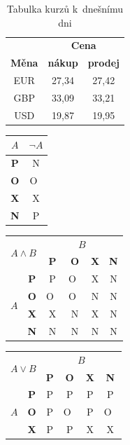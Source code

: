 \documentclass[11pt,a4paper]{article}
\begin{document}
\begin{table}[h!]
\centering
\begin{tabular}{| c | c | c | }
\hline
 & \multicolumn{2}{c|}{\textbf{Cena}} \\ \cline{2-3} \textbf{Měna} & \textbf{nákup} & \textbf{prodej} \\ \hline
EUR & 27,34 & 27,42 \\
GBP & 33,09 & 33,21 \\
USD & 19,87 & 19,95 \\
 \hline
\end{tabular}
\caption{Tabulka kurzů k~dnešnímu dni}
\label{tabulka1}
\end{table}
\begin{table}[h!]
\centering
\begin{tabular}{| c | c |}
\hline
$ A $ & $ \neg A $ \\ \hline 
\textbf{P} & N \\
\textbf{O} & O~\\
\textbf{X} & X \\
\textbf{N} & P \\
 \hline
\end{tabular}
\begin{tabular}{| c | c | c | c | c | c |}
\hline
\multicolumn{2}{|c}{\multirow{2}{*}{$ A \wedge B$}} & \multicolumn{4}{|c|}{$ B $} \\ \cline{3-6}
\multicolumn{2}{|c|}{} &  \textbf{P} & \textbf{O} & \textbf{X} & \textbf{N} \\ \hline  
\multirow{4}{*}{$ A $} &  \textbf{P} & P & O~& X & N \\ \cline{2-6}
&  \textbf{O} & O~& O~& N & N \\ \cline{2-6}
&  \textbf{X} & X & N & X & N \\ \cline{2-6}
&  \textbf{N} & N & N & N & N \\ \cline{1-6}
\end{tabular}
\begin{tabular}{| c | c | c | c | c | c |}
\hline
\multicolumn{2}{|c}{\multirow{2}{*}{$ A \vee B$}} & \multicolumn{4}{|c|}{$ B $} \\ \cline{3-6}
\multicolumn{2}{|c|}{} &  \textbf{P} & \textbf{O} & \textbf{X} & \textbf{N} \\ \hline  
\multirow{4}{*}{$ A $} &  \textbf{P} & P & P & P & P \\ \cline{2-6}
&  \textbf{O} & P & O~& P & O~\\ \cline{2-6}
&  \textbf{X} & P & P & X & X \\ \cline{2-6}

\end{tabular}
\end{table}
\end{document}

